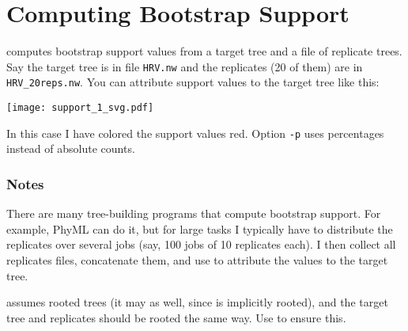 \section{Computing Bootstrap Support}

\support{} computes bootstrap support values from a target tree and a file of
replicate trees. Say the target tree is in file \texttt{HRV.nw} and the
replicates (20 of them) are in \texttt{HRV\_20reps.nw}. You can attribute
support values to the target tree like this:


\texttt{[image: support\_1\_svg.pdf]}

\noindent{}In this case I have colored the support values red. Option
\texttt{-p} uses percentages instead of absolute counts.

\subsubsection{Notes}

There are many tree-building programs that compute bootstrap support. For
example, PhyML can do it, but for large tasks I typically have to distribute
the replicates over several jobs (say, 100 jobs of 10 replicates each). I then
collect all replicates files, concatenate them, and use \support{} to attribute
the values to the target tree.

\support{} assumes rooted trees (it may as well, since \nw{} is implicitly
rooted), and the target tree and replicates should be rooted the same way. Use
\reroot{} to ensure this.
